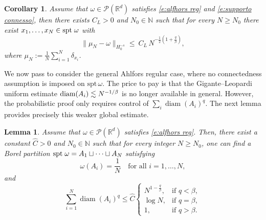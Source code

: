 \documentclass[12pt,a4paper,oneside]{amsart}
\theoremstyle{plain}
\newtheorem{lemma}[theorem]{Lemma}
\newtheorem{corollary}[theorem]{Corollary}
\theoremstyle{definition}
\numberwithin{equation}{section}
\numberwithin{figure}{section}
\numberwithin{table}{section}
\theoremstyle{remark}
\newcommand{\R}{\mathbb{R}}
\newcommand{\N}{\mathbb{N}}
\newcommand{\expAhlfors}{\beta}
\begin{document}
\begin{corollary}
Assume that $\omega\in \mathcal{P}(\R^d)$ satisfies \eqref{e:alfhors reg} and \eqref{e:supporto connesso}, then there exists $C_L>0$ and $N_0\in \N$ such that for every $N\geq N_0$ there exist $x_1,\dots,x_N \in \textup{spt} \; \omega$ with
\begin{equation}\label{e:upper-bound-cor}
\|\mu_N-\omega\|_{H_0^{-s}}\le\ C_L\,N^{-\frac{1}{2}(1+\frac{q}{\expAhlfors})},
\end{equation}
where ${\mu_N}:=\frac1N\sum_{i=1}^N \delta_{x_i}$. 
\end{corollary}

We now pass to consider the general Ahlfors regular case,
where no connectedness assumption is imposed on $\mathrm{spt}\,\omega$. The
price to pay is that the Gigante--Leopardi uniform estimate
$\textup{diam}(A_i)\lesssim N^{-1/\expAhlfors}$ is no longer available in
general. However, the probabilistic proof only requires control of
$\sum_i \operatorname{diam}(A_i)^q$. The next lemma provides precisely this weaker
global estimate.
\begin{lemma}\label{l:partizione senza connessione}
Assume that $\omega\in \mathcal{P}(\R^d)$ satisfies \eqref{e:alfhors reg}. Then, there exist a constant $\hat C > 0$ and $N_0 \in \mathbb{N}$ such that for every integer $N \ge N_0$, one can find a Borel partition $\textup{spt} \; \omega = A_1 \sqcup \cdots \sqcup A_N$ satisfying
\begin{equation*}
    \omega(A_i) = \frac1N \quad \text{for all } i=1,\dots,N,  
\end{equation*}
and
\begin{equation*}
     \sum_{i=1}^N \operatorname{diam}(A_i)^q \le \hat C
    \begin{cases} 
    N^{1-\frac{q}{\expAhlfors}}, & \text{if } q < \expAhlfors,\\[2mm] 
    \log N, & \text{if } q = \expAhlfors,\\[2mm] 
    1, & \text{if } q > \expAhlfors. 
    \end{cases}
\end{equation*}
\end{lemma}
\end{document}
